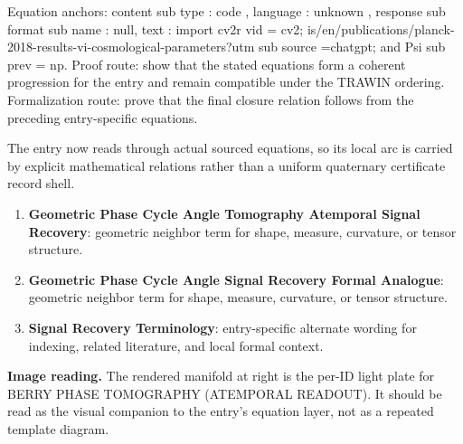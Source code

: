 Equation anchors: content sub type : code , language : unknown , response sub format sub name : null, text : import cv2r vid = cv2; is/en/publications/planck-2018-results-vi-cosmological-parameters?utm sub source =chatgpt; and Psi sub prev = np. Proof route: show that the stated equations form a coherent progression for the entry and remain compatible under the TRAWIN ordering. Formalization route: prove that the final closure relation follows from the preceding entry-specific equations.

The entry now reads through actual sourced equations, so its local arc is carried by explicit mathematical relations rather than a uniform quaternary certificate record shell.
\endgroup

\begin{enumerate}[leftmargin=1.6em,itemsep=6pt,topsep=4pt]
\item \textbf{Geometric Phase Cycle Angle Tomography Atemporal Signal Recovery}: geometric neighbor term for shape, measure, curvature, or tensor structure.
\item \textbf{Geometric Phase Cycle Angle Signal Recovery Formal Analogue}: geometric neighbor term for shape, measure, curvature, or tensor structure.
\item \textbf{Signal Recovery Terminology}: entry-specific alternate wording for indexing, related literature, and local formal context.
\end{enumerate}

\begin{samepage}
\noindent\begin{minipage}[t]{0.45\linewidth}
\vspace{0pt}
\raggedright
\scriptsize\textbf{Image reading.} The rendered manifold at right is the per-ID light plate for BERRY PHASE TOMOGRAPHY (ATEMPORAL READOUT). It should be read as the visual companion to the entry's equation layer, not as a repeated template diagram.\par
\end{minipage}\hfill
\begin{minipage}[t]{0.53\linewidth}
\vspace*{-0.10in}
\raggedright
{}
\end{minipage}
\end{samepage}

\clearpage


